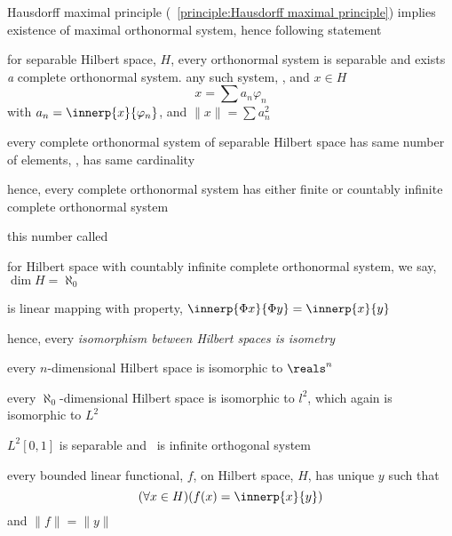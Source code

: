 \documentclass[17pt,landscape]{foils}
\begin{document}
{{	\vvitem Hausdorff maximal principle (\principlename~\ref{principle:Hausdorff maximal principle})
		implies existence of maximal orthonormal system,
		hence following statement

	\vitem for separable Hilbert space, $H$,
		every orthonormal system is separable
		and exists \emph{a} complete orthonormal system.
		any such system, , and $x\in H$
%
		\[
			x = \sum a_n \varphi_n
		\]
%
		with $a_n = \innerp{x}{\varphi_n}$,
		and $\|x\| = \sum a_n^2$
\eit


%

\bit
	\item every complete orthonormal system of separable Hilbert space
		has same number of elements, \ie, has same cardinality

	\vitem hence, every complete orthonormal system
		has
		either finite or countably infinite complete orthonormal system

	\vitem this number called %

	\bit
		\item for Hilbert space with countably infinite complete orthonormal system,
			we say, $\dim H = \aleph_0$
	\eit
\eit


%

\bit
	\item {}
		is linear mapping with property, $\innerp{\Phi x}{\Phi y} = \innerp{x}{y}$

	\vitem hence, every \emph{isomorphism between Hilbert spaces is isometry}

	\vvitem every $n$-dimensional Hilbert space is isomorphic to $\reals^n$

	\vitem every $\aleph_0$-dimensional Hilbert space is isomorphic to $l^2$,
		which again is isomorphic to $L^2$

	\vitem $L^2[0,1]$ is separable and \ is infinite orthogonal system

	\vvitem every bounded linear functional, $f$, on Hilbert space, $H$,
		has unique $y$ such that
	\[
		(\forall x\in H)(f(x)=\innerp{x}{y})
	\]
	and $\|f\|=\|y\|$
\eit
}{}


}
\end{document}
